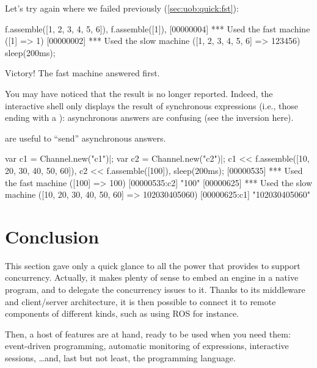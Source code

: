 Let's try again where we failed previously (\autoref{sec:uob:quick:fst}):

\begin{urbiscript}
f.assemble([1, 2, 3, 4, 5, 6]),
f.assemble([1]),
[00000004] *** Used the fast machine ([1] => 1)
[00000002] *** Used the slow machine ([1, 2, 3, 4, 5, 6] => 123456)
sleep(200ms);
\end{urbiscript}

Victory!  The fast machine answered first.

You may have noticed that the result is no longer reported.  Indeed, the \us
interactive shell only displays the result of synchronous expressions (i.e.,
those ending with a \samp{;}): asynchronous answers are confusing (see the
inversion here).

 are useful to ``send'' asynchronous answers.

\begin{urbiscript}
var c1 = Channel.new("c1")|;
var c2 = Channel.new("c2")|;
c1 << f.assemble([10, 20, 30, 40, 50, 60]),
c2 << f.assemble([100]),
sleep(200ms);
[00000535] *** Used the fast machine ([100] => 100)
[00000535:c2] "100"
[00000625] *** Used the slow machine ([10, 20, 30, 40, 50, 60] => 102030405060)
[00000625:c1] "102030405060"
\end{urbiscript}

\section{Conclusion}

This section gave only a quick glance to all the power that \urbi provides
to support concurrency.  Actually, it makes plenty of sense to embed an
\urbi engine in a native \Cxx program, and to delegate the concurrency
issues to it.  Thanks to its middleware and client/server architecture, it
is then possible to connect it to remote components of different kinds, such
as using ROS for instance.

Then, a host of features are at hand, ready to be used when you need them:
event-driven programming, automatic monitoring of expressions, interactive
sessions, \ldots and, last but not least, the \us programming language.




